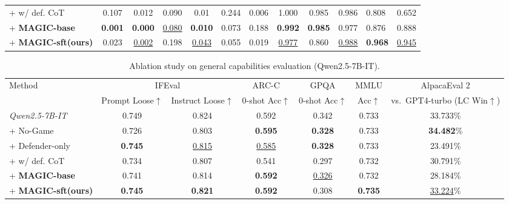 \documentclass[11pt, letterpaper]{template}
\theoremstyle{plain}
\theoremstyle{definition}
\theoremstyle{remark}
\begin{document}
\begin{table}[ht]
\begin{tabular}{lccccccccc p{1.35cm} p{1.45cm}}
\quad + w/ def. CoT
& 0.107 & 0.012 & 0.090 & 0.01 & 0.244 & 0.006
& 1.000 & 0.985 & 0.986
& 0.808 & \cellcolor{green!15}0.652 \\

\quad + \textbf{MAGIC-base}
& \textbf{0.001} & \textbf{0.000} & \underline{0.080} & \textbf{0.010} & 0.073 & 0.188
& \textbf{0.992} & \textbf{0.985} & 0.977
& 0.876 & 0.888 \\

\quad + \textbf{MAGIC-sft(ours)}
& 0.023 & \underline{0.002} & 0.198 & \underline{0.043} & 0.055 & 0.019
& \underline{0.977} & 0.860 & \underline{0.988}
& \textbf{0.968} & \underline{0.945} \\

\bottomrule
\end{tabular}
\end{table}

\begin{table}[ht]
\centering
\caption{Ablation study on general capabilities evaluation (Qwen2.5-7B-IT). }
\label{tab:qwen7b_ablation_general}
\setlength{\tabcolsep}{4pt}
\renewcommand{\arraystretch}{1.12}
\scriptsize
\begin{tabular}{lcccccc}
\toprule
Method
& \multicolumn{2}{c}{IFEval}
& ARC-C
& GPQA
& MMLU
& AlpacaEval 2  \\
\cmidrule(lr){2-3}\cmidrule(lr){4-4}\cmidrule(lr){5-5}\cmidrule(lr){6-6}\cmidrule(lr){7-7}
& Prompt Loose$\uparrow$
& Instruct Loose$\uparrow$
& 0-shot Acc$\uparrow$
& 0-shot Acc$\uparrow$
& Acc$\uparrow$
& vs.\ GPT4-turbo (LC Win$\uparrow$) \\
\midrule
\textit{Qwen2.5-7B-IT}& 0.749 & 0.824 & 0.592 & 0.342 & 0.733 &  33.733\% \\
\quad + No-Game &0.726 &0.803 &\textbf{0.595} &\textbf{0.328} & 0.733&\textbf{34.482}\% \\
\quad + Defender-only &\textbf{0.745}&\underline{0.815}  &\underline{0.585}  &\textbf{0.328}  &0.733  & \cellcolor{green!15}23.491\%\\
\quad + w/ def. CoT &0.734 &0.807 &0.541 &0.297 &0.732 &30.791\%\\
\quad + \textbf{MAGIC-base} &0.741  & 0.814  & \textbf{0.592}  &\underline{0.326}  &0.732  & \cellcolor{green!15}28.184\%   \\
\quad + \textbf{MAGIC-sft(ours)} &\textbf{0.745}&	\textbf{0.821}&	\textbf{0.592}&	0.308&	\textbf{0.735}&	\underline{33.224}\%  \\
\bottomrule
\end{tabular}
\vspace{-0.6em}
\end{table}
\end{document}
